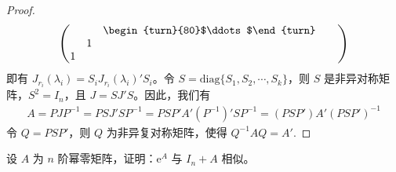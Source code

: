\documentclass[../../main.tex]{subfiles}%
\begin{document}
\begin{proof}
\begin{align*}
\begin{pmatrix}
& & \begin{turn}{80}$\ddots$\end{turn} & & \\
& 1 & & & \\
1 & & & &
\end{pmatrix}
\end{align*}
即有 $J_{r_i}(\lambda_i) = S_iJ_{r_i}(\lambda_i)'S_i$。令 $S = \mathrm{diag}\{S_1,S_2,\cdots,S_k\}$，则 $S$ 是非异对称矩阵，$S^2 = I_n$，且 $J = SJ'S$。因此，我们有
\begin{align*}
A = PJP^{-1} = PSJ'SP^{-1} = PSP'A'(P^{-1})'SP^{-1} = (PSP')A'(PSP')^{-1}
\end{align*}
令 $Q = PSP'$，则 $Q$ 为非异复对称矩阵，使得 $Q^{-1}AQ = A'$.
\end{proof}

\begin{proposition}\label{proposition:e^A与I_n+A相似}
设 $A$ 为 $n$ 阶幂零矩阵，证明：$\mathrm{e}^A$ 与 $I_n + A$ 相似。
\end{proposition}
\end{document}
